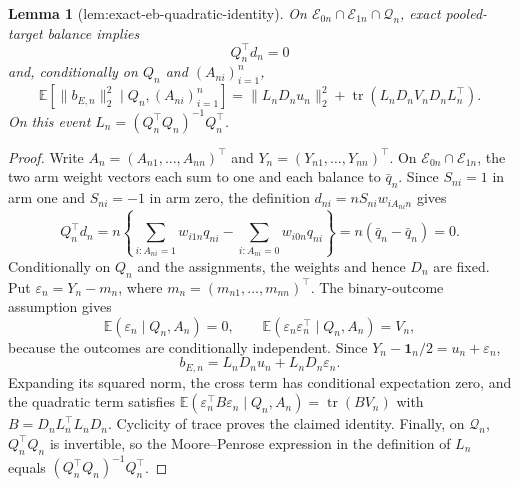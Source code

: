 \documentclass{article}
\newtheorem{lemma}{Lemma}
\begin{document}
\begin{lemma}[lem:exact-eb-quadratic-identity]\label{lem:exact-eb-quadratic-identity}
On \(\mathcal E_{0n}\cap\mathcal E_{1n}\cap\mathcal Q_n\), exact pooled-target balance implies
\[
 Q_n^{\top}d_n=0
\]
and, conditionally on \(Q_n\) and \((A_{ni})_{i=1}^n\),
\[
 \mathbb E\!\left[\|b_{E,n}\|_2^2\mid Q_n,(A_{ni})_{i=1}^n\right]
 =\|L_nD_nu_n\|_2^2+
   \operatorname{tr}(L_nD_nV_nD_nL_n^{\top}).
\]
On this event \(L_n=(Q_n^{\top}Q_n)^{-1}Q_n^{\top}\).
\end{lemma}
\begin{proof}
Write \(A_n=(A_{n1},\ldots,A_{nn})^{\top}\) and \(Y_n=(Y_{n1},\ldots,Y_{nn})^{\top}\).  On \(\mathcal E_{0n}\cap\mathcal E_{1n}\), the two arm weight vectors each sum to one and each balance to \(\bar q_n\).  Since \(S_{ni}=1\) in arm one and \(S_{ni}=-1\) in arm zero, the definition \(d_{ni}=nS_{ni}w_{iA_{ni}n}\) gives
\[
 Q_n^{\top}d_n
 =n\left\{\sum_{i:A_{ni}=1}w_{i1n}q_{ni}
           -\sum_{i:A_{ni}=0}w_{i0n}q_{ni}\right\}
 =n(\bar q_n-\bar q_n)=0.
\]
Conditionally on \(Q_n\) and the assignments, the weights and hence \(D_n\) are fixed.  Put \(\varepsilon_n=Y_n-m_n\), where \(m_n=(m_{n1},\ldots,m_{nn})^{\top}\).  The binary-outcome assumption gives
\[
 \mathbb E(\varepsilon_n\mid Q_n,A_n)=0,
 \qquad
 \mathbb E(\varepsilon_n\varepsilon_n^{\top}\mid Q_n,A_n)=V_n,
\]
because the outcomes are conditionally independent.  Since \(Y_n-\mathbf1_n/2=u_n+\varepsilon_n\),
\[
 b_{E,n}=L_nD_nu_n+L_nD_n\varepsilon_n.
\]
Expanding its squared norm, the cross term has conditional expectation zero, and the quadratic term satisfies \(\mathbb E(\varepsilon_n^{\top}B\varepsilon_n\mid Q_n,A_n)=\operatorname{tr}(BV_n)\) with \(B=D_nL_n^{\top}L_nD_n\).  Cyclicity of trace proves the claimed identity.  Finally, on \(\mathcal Q_n\), \(Q_n^{\top}Q_n\) is invertible, so the Moore--Penrose expression in the definition of \(L_n\) equals \((Q_n^{\top}Q_n)^{-1}Q_n^{\top}\).
\end{proof}
\end{document}
